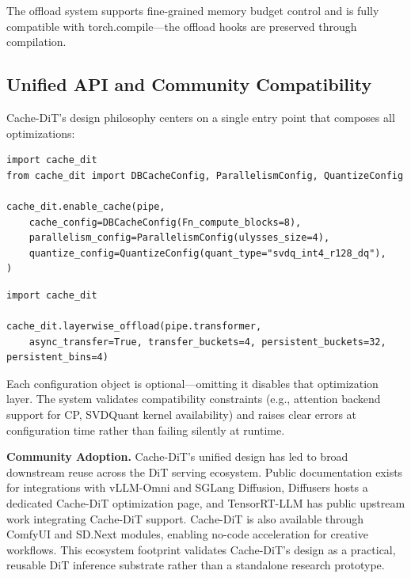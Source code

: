 \documentclass[10pt]{article}
\begin{document}
The offload system supports fine-grained memory budget control and is fully compatible with torch.compile---the offload hooks are preserved through compilation.

\subsection{Unified API and Community Compatibility}
\label{sec:api}

Cache-DiT's design philosophy centers on a single entry point that composes all optimizations:

\begin{lstlisting}[caption={One-line API: composing cache, parallelism, and quantization.}]
import cache_dit
from cache_dit import DBCacheConfig, ParallelismConfig, QuantizeConfig

cache_dit.enable_cache(pipe,
    cache_config=DBCacheConfig(Fn_compute_blocks=8),
    parallelism_config=ParallelismConfig(ulysses_size=4),
    quantize_config=QuantizeConfig(quant_type="svdq_int4_r128_dq"),
)
\end{lstlisting}

\begin{lstlisting}[caption={Optional API: bucket-style layerwise CPU offload.}]
import cache_dit

cache_dit.layerwise_offload(pipe.transformer,
    async_transfer=True, transfer_buckets=4, persistent_buckets=32, persistent_bins=4)
\end{lstlisting}

Each configuration object is optional---omitting it disables that optimization layer. The system validates compatibility constraints (e.g., attention backend support for CP, SVDQuant kernel availability) and raises clear errors at configuration time rather than failing silently at runtime.

\textbf{Community Adoption.} Cache-DiT's unified design has led to broad downstream reuse across the DiT serving ecosystem. Public documentation exists for integrations with vLLM-Omni and SGLang Diffusion, Diffusers hosts a dedicated Cache-DiT optimization page, and TensorRT-LLM has public upstream work integrating Cache-DiT support. Cache-DiT is also available through ComfyUI and SD.Next modules, enabling no-code acceleration for creative workflows. This ecosystem footprint validates Cache-DiT's design as a practical, reusable DiT inference substrate rather than a standalone research prototype.

\end{document}
